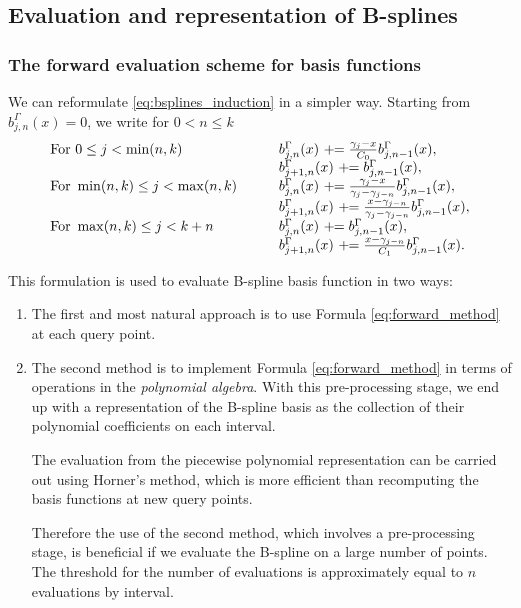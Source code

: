 \documentclass[a4paper]{article}
\newcommand{\1}{\textbf{1}}
\begin{document}
\subsection{Evaluation and representation of B-splines}
\subsubsection*{The forward evaluation scheme for basis functions}
\par \noindent We can reformulate \eqref{eq:bsplines_induction} in a simpler way. Starting from $b^\Gamma_{j, n}(x) = 0$, we write for $0 < n \leq k$
\begin{equation}\label{eq:forward_method}
\begin{array}{ll}
\textnormal{For} \ 0 \leq j < \min(n,k) & \qquad b^\Gamma_{j, n}(x)\ +\!\! = \frac{\gamma_j - x}{C_0} b^\Gamma_{j, n-1}(x),\\
										& \qquad b^\Gamma_{j+1, n}(x)\ +\!\! = b^\Gamma_{j, n-1}(x),\\
\textnormal{For} \ \min(n,k) \leq j < \max(n,k) & \qquad b^\Gamma_{j, n}(x)\ +\!\! = \frac{\gamma_j - x}{\gamma_j - \gamma_{j - n}} b^\Gamma_{j, n-1}(x),\\
											   & \qquad b^\Gamma_{j+1, n}(x)\ +\!\! = \frac{x - \gamma_{j - n}}{\gamma_j - \gamma_{j - n}} b^\Gamma_{j, n-1}(x),\\
\textnormal{For} \ \max(n,k) \leq j < k + n & \qquad b^\Gamma_{j, n}(x)\ +\!\! = b^\Gamma_{j, n-1}(x),\\
											& \qquad b^\Gamma_{j+1, n}(x)\ +\!\! = \frac{x - \gamma_{j - n}}{C_1} b^\Gamma_{j, n-1}(x).
\end{array}
\end{equation}
\par \noindent This formulation is used to evaluate B-spline basis function in two ways:
\begin{enumerate}
\item The first and most natural approach is to use Formula \eqref{eq:forward_method} at each query point. 
\item The second method is to implement Formula \eqref{eq:forward_method} in terms of operations in the \emph{polynomial algebra}. With this pre-processing stage, we end up with a representation of the B-spline basis as the collection of their polynomial coefficients on each interval. 
\par The evaluation from the piecewise polynomial representation can be carried out using Horner's method, which is more efficient than recomputing the basis functions at new query points. 
\par Therefore the use of the second method, which involves a pre-processing stage, is beneficial if we evaluate the B-spline on a large number of points. The threshold for the number of evaluations is approximately equal to $n$ evaluations by interval. 
\end{enumerate}
\end{document}
